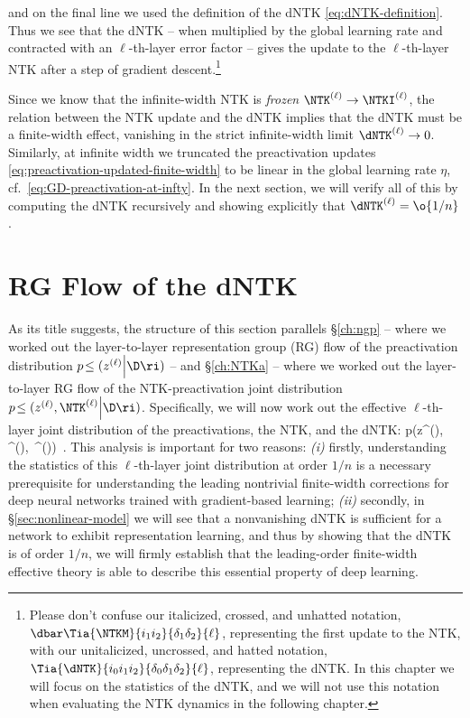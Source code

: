 and on the final line we used the definition of the dNTK \eqref{eq:dNTK-definition}.
Thus we see that the dNTK -- when multiplied by the global learning rate and contracted with an $\ell$-th-layer error factor --  gives the update to the $\ell$-th-layer NTK after a step of gradient descent.\footnote{
    Please don't confuse our italicized, crossed, and unhatted notation, $\dbar\Tia{\NTKM}{i_1i_2}{\delta_1\delta_2}{\ell}$, representing the first update to the NTK, with our unitalicized, uncrossed, and hatted notation, $\Tia{\dNTK}{i_0i_1i_2}{\delta_0 \delta_1\delta_2}{\ell}$, representing the dNTK. In this chapter we will focus on the statistics of the dNTK, and we will not use this notation when evaluating the NTK dynamics in the following chapter.}

Since we know that the infinite-width NTK is \emph{frozen} $\NTK^{(\ell)} \to \NTKI^{(\ell)}$, the relation between the NTK update and the dNTK implies that the dNTK must be a finite-width effect, vanishing in the strict infinite-width limit $\dNTK^{(\ell)} \to 0$. Similarly, at infinite width we truncated the preactivation updates \eqref{eq:preactivation-updated-finite-width} to be linear in the global learning rate $\eta$, cf.~\eqref{eq:GD-preactivation-at-infty}. In the next section, we will verify all of this by computing the dNTK recursively and showing explicitly that $\dNTK^{(\ell)} = \o{1/n}$.




\section{RG Flow of the dNTK}\label{sec:dNTK-RG}
As its title suggests, the structure of this section parallels \S\ref{ch:ngp} -- where we worked out the layer-to-layer representation group (RG) flow of the preactivation distribution $p\!\le(z^{(\ell)}\Big\vert \D\ri)$ -- and \S\ref{ch:NTKa} -- where we worked out the layer-to-layer RG flow of the NTK-preactivation joint distribution $p\!\le(z^{(\ell)}, \NTK^{(\ell)}\Big\vert \D\ri)$. Specifically, we will now work out the effective $\ell$-th-layer joint distribution of the preactivations, the NTK, and the dNTK:
\be
p\Big(z^{(\ell)}, \, \NTK^{(\ell)},\, \dNTK^{(\ell)}\Big\vert \D\Big)\, .
\ee 
This analysis is important for two reasons: \emph{(i)} firstly, understanding the statistics of this $\ell$-th-layer joint distribution at order $1/n$ is a necessary prerequisite for understanding the leading nontrivial finite-width corrections for deep neural networks trained with gradient-based learning; \emph{(ii)} secondly, in \S\ref{sec:nonlinear-model} we will see that a nonvanishing dNTK is sufficient for a network to exhibit representation learning, and  thus by showing that the dNTK is of order $1/n$, we will firmly establish that the leading-order finite-width effective theory is able to describe this essential property of deep learning.





